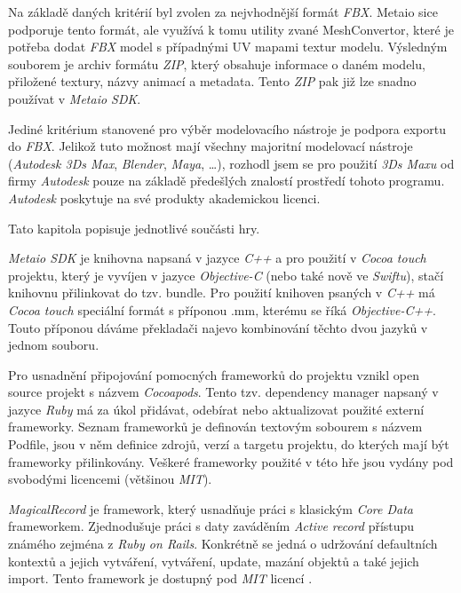 \documentclass[twoside,12pt]{article}
\begin{document}
Na základě daných kritérií byl zvolen za nejvhodnější formát \textit{FBX}. Metaio sice podporuje tento formát, ale využívá k tomu utility zvané MeshConvertor, které je potřeba dodat \textit{FBX} model s případnými UV mapami textur modelu. Výsledným souborem je archiv formátu \textit{ZIP}, který obsahuje informace o daném modelu, přiložené textury, názvy animací a metadata. Tento \textit{ZIP} pak již lze snadno používat v \textit{Metaio SDK}.

Jediné kritérium stanovené pro výběr modelovacího nástroje je podpora exportu do \textit{FBX}. Jelikož tuto možnost mají všechny majoritní modelovací nástroje (\textit{Autodesk 3Ds Max}, \textit{Blender}, \textit{Maya}, \dots), rozhodl jsem se pro použití \textit{3Ds Maxu} od firmy \textit{Autodesk} pouze na základě předešlých znalostí prostředí tohoto programu. \textit{Autodesk} poskytuje na své produkty akademickou licenci.


% 
\newpage


Tato kapitola popisuje jednotlivé součásti hry.  

\textit{Metaio SDK} je knihovna napsaná v jazyce \textit{C++} a pro použití v \textit{Cocoa touch} projektu, který je vyvíjen v jazyce \textit{Objective-C} (nebo také nově ve \textit{Swiftu}), stačí knihovnu přilinkovat do tzv. bundle. Pro použití knihoven psaných v \textit{C++} má \textit{Cocoa touch} speciální formát s příponou .mm, kterému se říká \textit{Objective-C++}. Touto příponou dáváme překladači najevo kombinování těchto dvou jazyků v jednom souboru. 

Pro usnadnění připojování pomocných frameworků do projektu vznikl open source projekt s názvem \textit{Cocoapods}. Tento tzv. dependency manager napsaný v jazyce \textit{Ruby} má za úkol přidávat, odebírat nebo aktualizovat použité externí frameworky. Seznam frameworků je definován textovým sobourem s názvem Podfile, jsou v něm definice zdrojů, verzí a targetu projektu, do kterých mají být frameworky přilinkovány. Veškeré frameworky použité v této hře jsou vydány pod svobodými licencemi (většinou \textit{MIT}).

\textit{MagicalRecord} je framework, který usnadňuje práci s klasickým \textit{Core Data} frameworkem. Zjednodušuje práci s daty zaváděním \textit{Active record} přístupu známého zejména z \textit{Ruby on Rails}. Konkrétně se jedná o udržování defaultních kontextů a jejich vytváření, vytváření, update, mazání objektů a také jejich import. Tento framework je dostupný pod \textit{MIT} licencí \cite{magical_record}.
\end{document}
